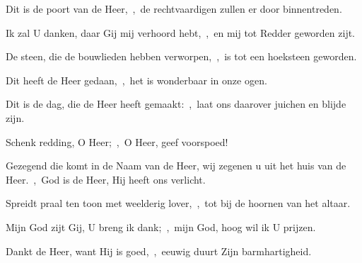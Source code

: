 \documentclass[12pt,twoside,a5paper]{article}
\begin{document}
\begin{halfparskip}
  Dit is de poort van de Heer,~\sep\ de rechtvaardigen zullen er door binnentreden.

  Ik zal U danken, daar Gij mij verhoord hebt,~\sep\ en mij tot Redder geworden zijt.

  De steen, die de bouwlieden hebben verworpen,~\sep\ is tot een hoeksteen geworden.

  Dit heeft de Heer gedaan,~\sep\ het is wonderbaar in onze ogen.

  Dit is de dag, die de Heer heeft gemaakt:~\sep\ laat ons daarover juichen en blijde zijn.

  Schenk redding, O Heer;~\sep\ O Heer, geef voorspoed!

  Gezegend die komt in de Naam van de Heer, wij zegenen u uit het huis van de Heer.~\sep\ God is de Heer, Hij heeft ons verlicht.

  Spreidt praal ten toon met weelderig lover,~\sep\ tot bij de hoornen van het altaar.

  Mijn God zijt Gij, U breng ik dank;~\sep\ mijn God, hoog wil ik U prijzen.

  Dankt de Heer, want Hij is goed,~\sep\ eeuwig duurt Zijn barmhartigheid.
\end{halfparskip}

\end{document}
